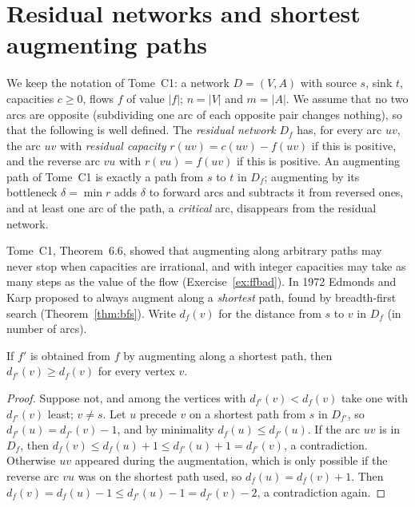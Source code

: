 \section{Residual networks and shortest augmenting paths}\label{sec:edmondskarp}

We keep the notation of Tome~C1: a network $D=(V,A)$ with source $s$, sink $t$, capacities $c\ge0$, flows $f$ of value $|f|$; $n=|V|$ and $m=|A|$. We assume that no two arcs are
opposite (subdividing one arc of each opposite pair changes nothing), so that the following is well defined. The \emph{residual network} $D_f$ has, for every arc $uv$, the arc $uv$ with
\emph{residual capacity} $r(uv)=c(uv)-f(uv)$ if this is positive, and the reverse arc $vu$ with $r(vu)=f(uv)$ if this is positive. An augmenting path of Tome~C1 is exactly a path from $s$ to $t$ in $D_f$; augmenting by
its bottleneck $\delta=\min r$ adds $\delta$ to forward arcs and subtracts it from reversed ones, and at least one arc of the path, a \emph{critical} arc, disappears from the residual network.

Tome~C1, Theorem~6.6, showed that augmenting along arbitrary paths may never stop when capacities are irrational, and with integer capacities may take as many steps as the value of the flow
(Exercise~\ref{ex:ffbad}). In 1972 Edmonds and Karp proposed to always augment along a \emph{shortest} path, found by breadth-first search (Theorem~\ref{thm:bfs}). Write $d_f(v)$ for the distance from $s$ to $v$ in $D_f$
(in number of arcs).

\begin{lemma}\label{lem:monotonedist}
If $f'$ is obtained from $f$ by augmenting along a shortest path, then $d_{f'}(v)\ge d_f(v)$ for every vertex $v$.
\end{lemma}
\begin{proof}
Suppose not, and among the vertices with $d_{f'}(v)<d_f(v)$ take one with $d_{f'}(v)$ least; $v\ne s$. Let $u$ precede $v$ on a shortest path from $s$ in $D_{f'}$, so $d_{f'}(u)=d_{f'}(v)-1$, and by minimality $d_f(u)\le d_{f'}(u)$.
If the arc $uv$ is in $D_f$, then $d_f(v)\le d_f(u)+1\le d_{f'}(u)+1=d_{f'}(v)$, a contradiction. Otherwise $uv$ appeared during the augmentation, which is only possible if the reverse arc $vu$ was on the shortest path used, so
$d_f(u)=d_f(v)+1$. Then $d_f(v)=d_f(u)-1\le d_{f'}(u)-1=d_{f'}(v)-2$, a contradiction again.
\end{proof}

